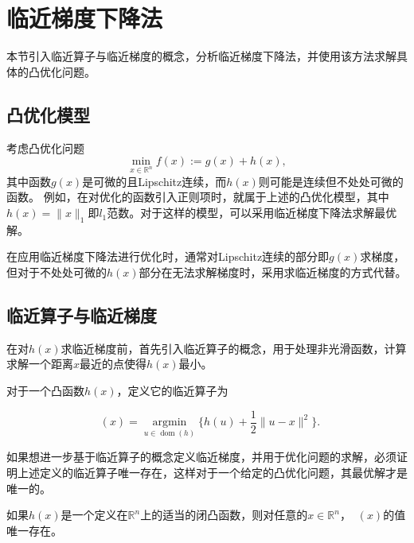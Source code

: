 \section{临近梯度下降法}

本节引入临近算子与临近梯度的概念，分析临近梯度下降法，并使用该方法求解具体的凸优化问题。

\subsection{凸优化模型}

考虑凸优化问题
\begin{equation}\label{eq_prox_1}
    \min\limits_{x\in \mathbb{R}^{n}} f(x) := g(x) + h(x),
\end{equation}
其中函数$g(x)$是可微的且Lipschitz连续，而$h(x)$则可能是连续但不处处可微的函数。
例如，在对优化的函数引入正则项时，就属于上述的凸优化模型，其中$h(x)=\|x\|_{1}$即$l_{1}$范数。对于这样的模型，可以采用临近梯度下降法求解最优解。

在应用临近梯度下降法进行优化时，通常对Lipschitz连续的部分即$g(x)$求梯度，但对于不处处可微的$h(x)$部分在无法求解梯度时，采用求临近梯度的方式代替。

\subsection{临近算子与临近梯度}

在对$h(x)$求临近梯度\cite{2014Prox}前，首先引入临近算子的概念，用于处理非光滑函数，计算求解一个距离$x$最近的点使得$h(x)$最小。

\begin{definition}\label{def_prox_1}
    对于一个凸函数$h(x)$，定义它的临近算子为

    \begin{equation}
        \mathop{\mathrm{prox_{h}}}(x) = \mathop{\mathrm{argmin}}\limits_{u\in \mathop{\mathrm{dom}} (h)}\{h(u)+\frac{1}{2}\|u-x\|^{2}\}.
    \end{equation}

\end{definition}

如果想进一步基于临近算子的概念定义临近梯度，并用于优化问题的求解，必须证明上述定义的临近算子唯一存在，这样对于一个给定的凸优化问题，其最优解才是唯一的。

\begin{theorem}\label{thm_prox_1}
    如果$h(x)$是一个定义在$\mathbb{R}^{n}$上的适当的闭凸函数，则对任意的$x\in \mathbb{R}^{n}$，$\mathop{\mathrm{prox_{h}}}(x)$的值唯一存在。
\end{theorem}

